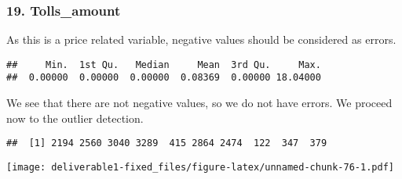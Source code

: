 \documentclass[
  18pt,
  a4paper]{article}
\newenvironment{Shaded}{\begin{snugshade}}{\end{snugshade}}
\newcommand{\DataTypeTok}[1]{\textcolor[rgb]{0.13,0.29,0.53}{#1}}
\newcommand{\KeywordTok}[1]{\textcolor[rgb]{0.13,0.29,0.53}{\textbf{#1}}}
\newcommand{\NormalTok}[1]{#1}
\newcommand{\OperatorTok}[1]{\textcolor[rgb]{0.81,0.36,0.00}{\textbf{#1}}}
\newcommand{\StringTok}[1]{\textcolor[rgb]{0.31,0.60,0.02}{#1}}
\begin{document}
\hypertarget{tolls_amount}{%
\subsubsection{19. Tolls\_amount}\label{tolls_amount}}

As this is a price related variable, negative values should be
considered as errors.

\begin{Shaded}
\end{Shaded}

\begin{verbatim}
##     Min.  1st Qu.   Median     Mean  3rd Qu.     Max. 
##  0.00000  0.00000  0.00000  0.08369  0.00000 18.04000
\end{verbatim}

We see that there are not negative values, so we do not have errors. We
proceed now to the outlier detection.

\begin{Shaded}
\end{Shaded}

\begin{verbatim}
##  [1] 2194 2560 3040 3289  415 2864 2474  122  347  379
\end{verbatim}

\begin{Shaded}
\end{Shaded}

\texttt{[image: deliverable1-fixed\_files/figure-latex/unnamed-chunk-76-1.pdf]}

\begin{Shaded}
\end{Shaded}
\end{document}
